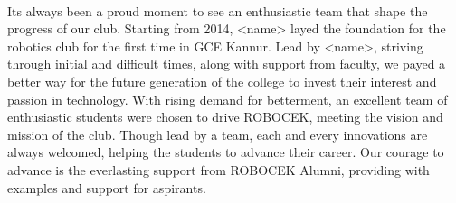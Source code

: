     \begin{figure}
        \centering
         \\
        \quad
    \end{figure}
    
    Its always been a proud moment to see an enthusiastic team that shape the progress of our club. Starting from 2014, <name> layed the foundation for the robotics club for the first time in GCE Kannur. Lead by <name>, striving through initial and difficult times, along with support from faculty, we payed a better way for the future generation of the college to invest their interest and passion in technology. With rising demand for betterment, an excellent team of enthusiastic students were chosen to drive ROBOCEK, meeting the vision and mission of the club. Though lead by a team, each and every innovations are always welcomed, helping the students to advance their career. Our courage to advance is the everlasting support from ROBOCEK Alumni, providing with examples and support for aspirants.

